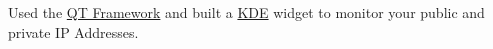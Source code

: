 {Used the \href{https://www.qt.io/product/framework}{QT Framework} and built a \href{https://kde.org/}{KDE} widget to monitor your public and private IP Addresses.}
